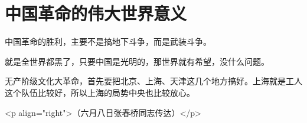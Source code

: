 \section[中国革命的伟大世界意义（一九六七年六月）]{中国革命的伟大世界意义}


中国革命的胜利，主要不是搞地下斗争，而是武装斗争。

就是全世界都黑了，只要中国是光明的，那世界就有希望，没什么问题。

无产阶级文化大革命，首先要把北京、上海、天津这几个地方搞好。上海就是工人这个队伍比较好，所以上海的局势中央也比较放心。

<p align="right">（六月八日张春桥同志传达）</p>


